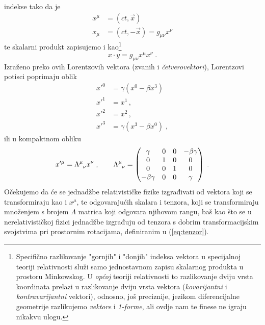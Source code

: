 indekse tako da je
\begin{align}
x^\mu &= (ct, \vec{x}) \\
x_\mu &= (ct,-\vec{x}) = g_{\mu\nu} x^\nu
\end{align}
te skalarni produkt zapisujemo i kao\footnote{Specifično 
razlikovanje "gornjih" i "donjih" indeksa vektora u
specijalnoj teoriji relativnosti služi samo jednostavnom zapisu
skalarnog produkta u prostoru Minkowskog.
U \emph{općoj} teoriji relativnosti to razlikovanje dviju vrsta
koordinata prelazi u razlikovanje dviju vrsta vektora 
(\emph{kovarijantni} i \emph{kontravarijantni} vektori), odnosno,
još preciznije, jezikom diferencijalne geometrije razlikujemo 
\emph{vektore} i \emph{1-forme}, ali ovdje nam te finese ne igraju
nikakvu ulogu.}
\begin{equation}
     x \cdot y = g_{\mu\nu} x^{\mu}x^{\nu} \;.
\end{equation}
Izraženo preko ovih Lorentzovih vektora (zvanih i \emph{četverovektori}),
Lorentzovi potisci poprimaju oblik 
\begin{align}
x'^{0} &= \gamma (x^0 - \beta x^3 ) \\
x'^{1} &= x^1 \,, \\
x'^{2} &= x^2 \,, \\
x'^{3} &= \gamma (x^3 -\beta x^0 ) \;,
\end{align}
ili u kompaktnom obliku
\begin{equation}
    x'^{\mu} = \tensor{\Lambda}{^{\mu}_{\nu}} x^\nu \;, \qquad
\tensor{\Lambda}{^{\mu}_{\nu}} =
\begin{pmatrix}
\gamma & 0 & 0 & -\beta\gamma \\
0 & 1 & 0 & 0 \\
0 & 0 & 1 & 0 \\
-\beta\gamma & 0 & 0 & \gamma
\end{pmatrix} \;.
\label{eq:deflambda}
\end{equation}
Očekujemo da će se jednadžbe
relativističke fizike izgrađivati od vektora koji se transformiraju
kao i $x^{\mu}$, te odgovarajućih
skalara i tenzora, koji se transformiraju množenjem s brojem $\Lambda$ matrica
koji odgovara njihovom rangu, baš kao što se u nerelativističkoj fizici jednadžbe
izgrađuju od tenzora s dobrim transformacijskim svojstvima pri prostornim rotacijama,
definiranim u (\ref{eq:tenzor}).

